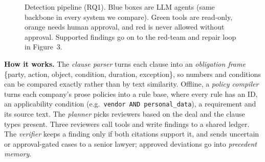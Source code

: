 \documentclass[11pt,a4paper]{article}
\begin{document}
\begin{figure}[H]
{}
\caption{Detection pipeline (RQ1). Blue boxes are LLM agents (same backbone in every system we compare). Green tools are read-only, orange needs human approval, and red is never allowed without approval. Supported findings go on to the red-team and repair loop in Figure~3.}
\end{figure}

\textbf{How it works.} The \emph{clause parser} turns each clause into an \emph{obligation frame} \{party, action, object, condition, duration, exception\}, so numbers and conditions can be compared exactly rather than by text similarity. Offline, a \emph{policy compiler} turns each company's prose policies into a rule base, where every rule has an ID, an applicability condition (e.g.\ \texttt{vendor AND personal\_data}), a requirement and its source text. The \emph{planner} picks reviewers based on the deal and the clause types present. Three reviewers call tools and write findings to a shared ledger. The \emph{verifier} keeps a finding only if both citations support it, and sends uncertain or approval-gated cases to a senior lawyer; approved deviations go into \emph{precedent memory}.
\end{document}
